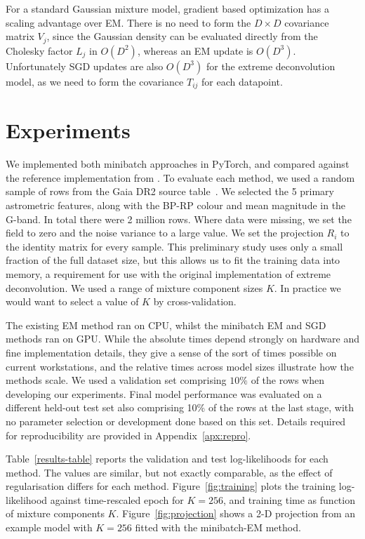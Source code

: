 \documentclass{article}
\begin{document}
For a standard Gaussian mixture model, gradient based optimization has a scaling advantage over EM\@. There is no need to form the $D\!\times\!D$ covariance matrix $V_j$, since the Gaussian density can be evaluated directly from the Cholesky factor $L_j$ in $O(D^2)$, whereas an EM update is $O(D^3)$.
Unfortunately SGD updates are also $O(D^3)$ for the extreme deconvolution model, as we need to form the covariance $T_{ij}$ for each datapoint.

\section{Experiments}
\label{sec:experiments}

We implemented both minibatch approaches in PyTorch, and compared against the reference implementation from \citet{bovyExtremeDeconvolutionInferring2011}.
To evaluate each method, we used a random sample of rows from the Gaia DR2 source table~\cite{brownGaiaDataRelease2018}.
We selected the 5 primary astrometric features, along with the BP-RP colour and mean magnitude in the G-band.
In total there were 2 million rows.
Where data were missing, we set the field to zero and the noise variance to a large value.
We set the projection $R_i$ to the identity matrix for every sample.
This preliminary study uses only a small fraction of the full dataset size, but this allows us to fit the training data into memory, a requirement for use with the original implementation of extreme deconvolution.
We used a range of mixture component sizes $K$.
In practice we would want to select a value of $K$ by cross-validation.

The existing EM method ran on CPU, whilst the minibatch EM and SGD methods ran on GPU\@.
While the absolute times depend strongly on hardware and fine implementation details, they give a sense of the sort of times possible on current workstations, and the relative times across model sizes illustrate how the methods scale.
We used a validation set comprising $10\%$ of the rows when developing our experiments.
Final model performance was evaluated on a different held-out test set also comprising 10\% of the rows at the last stage, with no parameter selection or development done based on this set.
Details required for reproducibility are provided in Appendix~\ref{apx:repro}.

Table~\ref{results-table} reports the validation and test log-likelihoods for each method.
The values are similar, but not exactly comparable, as the effect of regularisation differs for each method.
Figure~\ref{fig:training} plots the training log-likelihood against time-rescaled epoch for $K=256$, and training time as function of mixture components $K$.
Figure~\ref{fig:projection} shows a 2-D projection from an example model with $K=256$ fitted with the minibatch-EM method.
\end{document}
